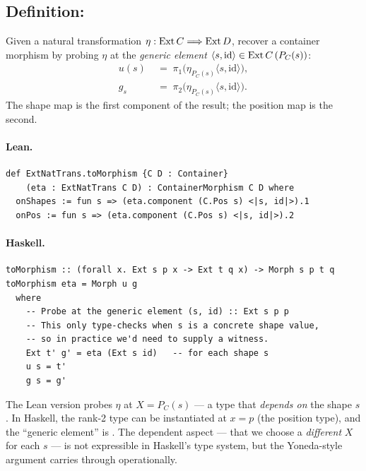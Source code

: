 \documentclass[11pt,a4paper]{article}
\begin{document}
\subsection{Definition: }

\begin{defn}
Given a natural transformation $\eta : \mathrm{Ext}\,C \Longrightarrow \mathrm{Ext}\,D$,
recover a container morphism by probing $\eta$ at the \emph{generic element}
$\langle s, \mathrm{id} \rangle \in \mathrm{Ext}\,C\,(P_C(s))$:
\begin{align*}
  u(s)  &\;=\; \pi_1\bigl(\eta_{P_C(s)}\langle s, \mathrm{id} \rangle\bigr), \\
  g_s   &\;=\; \pi_2\bigl(\eta_{P_C(s)}\langle s, \mathrm{id} \rangle\bigr).
\end{align*}
The shape map is the first component of the result; the position map is the
second.
\end{defn}

\paragraph{Lean.}
\begin{lstlisting}[style=lean]
def ExtNatTrans.toMorphism {C D : Container}
    (eta : ExtNatTrans C D) : ContainerMorphism C D where
  onShapes := fun s => (eta.component (C.Pos s) <|s, id|>).1
  onPos := fun s => (eta.component (C.Pos s) <|s, id|>).2
\end{lstlisting}

\paragraph{Haskell.}
\begin{lstlisting}[style=haskell]
toMorphism :: (forall x. Ext s p x -> Ext t q x) -> Morph s p t q
toMorphism eta = Morph u g
  where
    -- Probe at the generic element (s, id) :: Ext s p p
    -- This only type-checks when s is a concrete shape value,
    -- so in practice we'd need to supply a witness.
    Ext t' g' = eta (Ext s id)   -- for each shape s
    u s = t'
    g s = g'
\end{lstlisting}

\begin{fidelitynote}
The Lean version probes $\eta$ at $X = P_C(s)$ --- a type that \emph{depends
on} the shape $s$.  In Haskell, the rank-2 type
 can be instantiated at $x = p$
(the position type), and the ``generic element'' is .  The
dependent aspect --- that we choose a \emph{different} $X$ for each $s$ ---
is not expressible in Haskell's type system, but the Yoneda-style argument
carries through operationally.
\end{fidelitynote}
\end{document}

